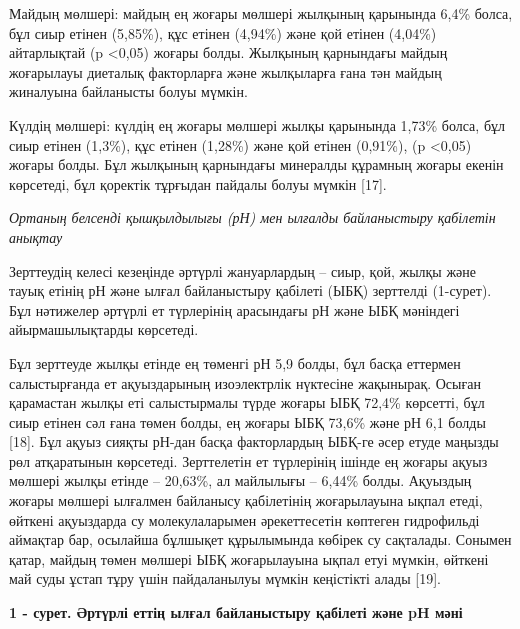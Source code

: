 \begin{multicols}{2}
Майдың мөлшері: майдың ең жоғары мөлшері жылқының қарынында 6,4\% болса,
бұл сиыр етінен (5,85\%), құс етінен (4,94\%) және қой етінен (4,04\%)
айтарлықтай (p \textless0,05) жоғары болды. Жылқының қарнындағы майдың
жоғарылауы диеталық факторларға және жылқыларға ғана тән майдың
жиналуына байланысты болуы мүмкін.

Күлдің мөлшері: күлдің ең жоғары мөлшері жылқы қарынында 1,73\% болса,
бұл сиыр етінен (1,3\%), құс етінен (1,28\%) және қой етінен (0,91\%),
(p \textless0,05) жоғары болды. Бұл жылқының қарнындағы минералды
құрамның жоғары екенін көрсетеді, бұл қоректік тұрғыдан пайдалы болуы
мүмкін {[}17{]}.

\emph{Ортаның белсенді қышқылдылығы (рН) мен ылғалды байланыстыру
қабілетін анықтау}

Зерттеудің келесі кезеңінде әртүрлі жануарлардың -- сиыр, қой, жылқы
және тауық етінің рН және ылғал байланыстыру қабілеті (ЫБҚ) зерттелді
(1-сурет). Бұл нәтижелер әртүрлі ет түрлерінің арасындағы рН және ЫБҚ
мәніндегі айырмашылықтарды көрсетеді.

Бұл зерттеуде жылқы етінде ең төменгі рН 5,9 болды, бұл басқа еттермен
салыстырғанда ет ақуыздарының изоэлектрлік нүктесіне жақынырақ. Осыған
қарамастан жылқы еті салыстырмалы түрде жоғары ЫБҚ 72,4\% көрсетті, бұл
сиыр етінен сәл ғана төмен болды, ең жоғары ЫБҚ 73,6\% және рН 6,1 болды
{[}18{]}. Бұл ақуыз сияқты рН-дан басқа факторлардың ЫБҚ-ге әсер етуде
маңызды рөл атқаратынын көрсетеді. Зерттелетін ет түрлерінің ішінде ең
жоғары ақуыз мөлшері жылқы етінде -- 20,63\%, ал майлылығы -- 6,44\%
болды. Ақуыздың жоғары мөлшері ылғалмен байланысу қабілетінің
жоғарылауына ықпал етеді, өйткені ақуыздарда су молекулаларымен
әрекеттесетін көптеген гидрофильді аймақтар бар, осылайша бұлшықет
құрылымында көбірек су сақталады. Сонымен қатар, майдың төмен мөлшері
ЫБҚ жоғарылауына ықпал етуі мүмкін, өйткені май суды ұстап тұру үшін
пайдаланылуы мүмкін кеңістікті алады {[}19{]}.
\end{multicols}

{\bfseries 1 - сурет. Әртүрлі еттің ылғал байланыстыру қабілеті және pH мәні}

